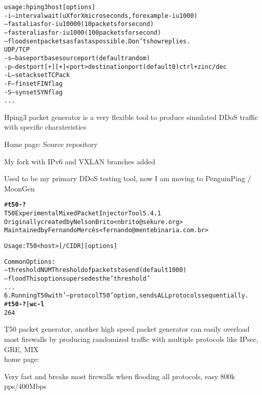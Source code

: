 \documentclass[Screen16to9,17pt]{foils}
\begin{document}

\begin{alltt}\footnotesize
usage: hping3 host [options]
  -i  --interval  wait (uX for X microseconds, for example -i u1000)
      --fast      alias for -i u10000 (10 packets for second)
      --faster    alias for -i u1000 (100 packets for second)
      --flood      sent packets as fast as possible. Don't show replies.
UDP/TCP
  -s  --baseport   base source port             (default random)
  -p  --destport   [+][+]<port> destination port(default 0) ctrl+z inc/dec
  -L  --setack     set TCP ack
  -F  --fin        set FIN flag
  -S  --syn        set SYN flag
...
\end{alltt}

\begin{list2}
\item Hping3 packet generator is a very flexible tool to produce simulated DDoS traffic with specific charateristics
\item Home page:  Source repository 
\item My fork with IPv6 and VXLAN branches added 
\item Used to be my primary DDoS testing tool, now I am moving to PenguinPing / MoonGen
\end{list2}




\begin{alltt}\footnotesize
# {\bf t50 -?}
T50 Experimental Mixed Packet Injector Tool 5.4.1
Originally created by Nelson Brito <nbrito@sekure.org>
Maintained by Fernando Mercês <fernando@mentebinaria.com.br>

Usage: T50 <host> [/CIDR] [options]

Common Options:
    --threshold NUM        Threshold of packets to send     (default 1000)
    --flood                This option supersedes the 'threshold'
...
6. Running T50 with '--protocol T50' option, sends ALL protocols sequentially.
# {\bf t50 -? | wc -l}
264
\end{alltt}

\begin{list2}
\item T50 packet generator, another high speed packet generator
can easily overload most firewalls by producing randomized traffic with multiple protocols like IPsec, GRE, MIX \\
home page: 
\item Very fast and breaks most firewalls when flooding all protocols, easy 800k pps/400Mbps
\end{list2}
\end{document}
